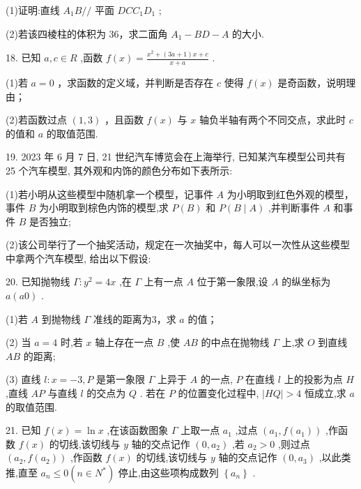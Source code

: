 \documentclass[10pt]{article}
\begin{document}
(1)证明:直线 \({A}_{1}B//\) 平面 \({DC}{C}_{1}{D}_{1}\) ;

(2)若该四棱柱的体积为 36，求二面角 \({A}_{1} - {BD} - A\) 的大小.

18. 已知 \(a,c \in  R\) ,函数 \(f\left( x\right)  = \frac{{x}^{2} + \left( {{3a} + 1}\right) x + c}{x + a}\) .

(1)若 \(a = 0\) ，求函数的定义域，并判断是否存在 \(c\) 使得 \(f\left( x\right)\) 是奇函数，说明理由；

(2)若函数过点 \(\left( {1,3}\right)\) ，且函数 \(f\left( x\right)\) 与 \(x\) 轴负半轴有两个不同交点，求此时 \(c\) 的值和 \(a\) 的取值范围.

19. 2023 年 6 月 7 日, 21 世纪汽车博览会在上海举行, 已知某汽车模型公司共有 25 个汽车模型, 其外观和内饰的颜色分布如下表所示:

\begin{center}
\end{center}

(1)若小明从这些模型中随机拿一个模型，记事件 \(A\) 为小明取到红色外观的模型，事件 \(B\) 为小明取到棕色内饰的模型,求 \(P\left( B\right)\) 和 \(P\left( {B \mid  A}\right)\) ,并判断事件 \(A\) 和事件 \(B\) 是否独立;

(2)该公司举行了一个抽奖活动，规定在一次抽奖中，每人可以一次性从这些模型中拿两个汽车模型, 给出以下假设:

20. 已知抛物线 \(\Gamma  : {y}^{2} = {4x}\) ,在 \(\Gamma\) 上有一点 \(A\) 位于第一象限,设 \(A\) 的纵坐标为 \(a\left( {a0}\right)\) .

(1)若 \(A\) 到抛物线 \(\Gamma\) 准线的距离为3，求 \(a\) 的值；

(2) 当 \(a = 4\) 时,若 \(x\) 轴上存在一点 \(B\) ,使 \({AB}\) 的中点在抛物线 \(\Gamma\) 上,求 \(O\) 到直线 \({AB}\) 的距离;

(3) 直线 \(l : x =  - 3,P\) 是第一象限 \(\Gamma\) 上异于 \(A\) 的一点, \(P\) 在直线 \(l\) 上的投影为点 \(H\) ,直线 \({AP}\) 与直线 \(l\) 的交点为 \(Q\) . 若在 \(P\) 的位置变化过程中, \(\left| {HQ}\right|  > 4\) 恒成立,求 \(a\) 的取值范围.

21. 已知 \(f\left( x\right)  = \ln x\) ,在该函数图象 \(\Gamma\) 上取一点 \({a}_{1}\) ,过点 \(\left( {{a}_{1},f\left( {a}_{1}\right) }\right)\) ,作函数 \(f\left( x\right)\) 的切线,该切线与 \(y\) 轴的交点记作 \(\left( {0,{a}_{2}}\right)\) ,若 \({a}_{2} > 0\) ,则过点 \(\left( {{a}_{2},f\left( {a}_{2}\right) }\right)\) ,作函数 \(f\left( x\right)\) 的切线,该切线与 \(y\) 轴的交点记作 \(\left( {0,{a}_{3}}\right)\) ,以此类推,直至 \({a}_{n} \leq  0\left( {n \in  {N}^{ * }}\right)\) 停止,由这些项构成数列 \(\left\{  {a}_{n}\right\}\) .
\end{document}
